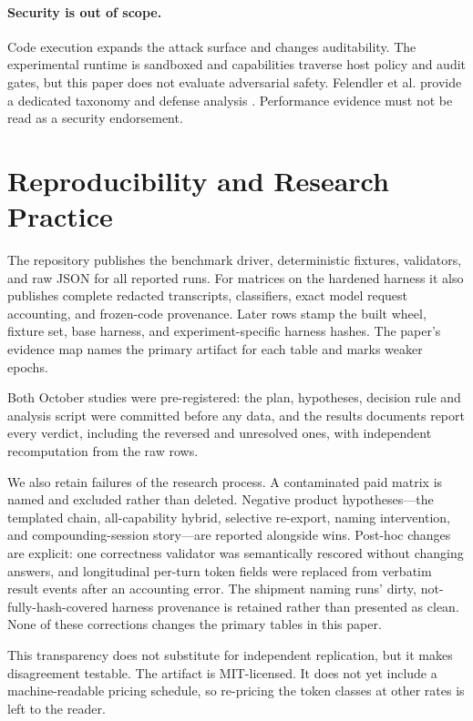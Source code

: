\documentclass[10pt,twocolumn]{article}
\begin{document}
\paragraph{Security is out of scope.}
Code execution expands the attack surface and changes auditability.  The
experimental runtime is sandboxed and capabilities traverse host policy and
audit gates, but this paper does not evaluate adversarial safety.  Felendler et
al. provide a dedicated taxonomy and defense analysis
\cite{felendler2026mcp}.  Performance evidence must not be read as a security
endorsement.

\section{Reproducibility and Research Practice}

The repository publishes the benchmark driver, deterministic fixtures,
validators, and raw JSON for all reported runs.  For matrices on the hardened harness
it also publishes complete redacted transcripts, classifiers, exact model
request accounting, and frozen-code provenance.  Later rows stamp the built
wheel, fixture set, base harness, and experiment-specific harness hashes.  The
paper's evidence map names the primary artifact for each table and marks weaker
epochs.

Both October studies were pre-registered: the plan, hypotheses, decision rule
and analysis script were committed before any data, and the results documents
report every verdict, including the reversed and unresolved ones, with
independent recomputation from the raw rows.

We also retain failures of the research process.  A contaminated paid matrix
is named and excluded rather than deleted.  Negative product hypotheses---the
templated chain, all-capability hybrid, selective re-export, naming intervention,
and compounding-session story---are reported alongside wins.  Post-hoc changes
are explicit: one correctness validator was semantically rescored without
changing answers, and longitudinal per-turn token fields were replaced from
verbatim result events after an accounting error.  The shipment naming runs'
dirty, not-fully-hash-covered harness provenance is retained rather than
presented as clean.  None of these corrections changes the primary
tables in this paper.

This transparency does not substitute for independent replication, but it
makes disagreement testable.  The artifact is MIT-licensed.  It does not yet
include a machine-readable pricing schedule, so re-pricing the token classes
at other rates is left to the reader.
\end{document}
